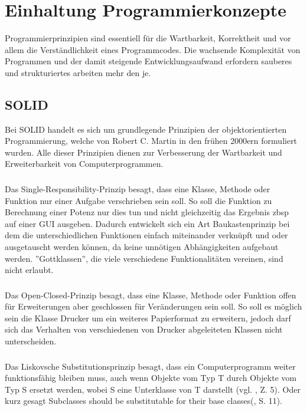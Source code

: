 
\section{Einhaltung Programmierkonzepte}

Programmierprinzipien sind essentiell für die Wartbarkeit, Korrektheit und vor allem die Verständlichkeit eines Programmcodes. Die wachsende Komplexität von Programmen und der damit steigende Entwicklungsaufwand erfordern sauberes und strukturiertes arbeiten mehr den je. 


\subsection{SOLID}
Bei SOLID handelt es sich um grundlegende Prinzipien der objektorientierten Programmierung, welche von Robert C. Martin in den frühen 2000ern formuliert wurden.  Alle dieser Prinzipien dienen zur Verbesserung der Wartbarkeit und Erweiterbarkeit von Computerprogrammen. 



\subsubsection{\textPrincipleSingleResponsibility}
\label{\textPrincipleSingleResponsibility}
Das Single-Responsibility-Prinzip besagt, dass eine Klasse, Methode oder Funktion
nur einer Aufgabe verschrieben sein soll. So soll die Funktion zu Berechnung einer
Potenz nur dies tun und nicht gleichzeitig das Ergebnis zbsp auf einer GUI ausgeben.
Dadurch entwickelt sich ein Art Baukastenprinzip bei dem die unterschiedlichen 
Funktionen einfach miteinander verknüpft und oder ausgetauscht werden können, da
keine unnötigen Abhängigkeiten aufgebaut werden. ''Gottklassen'', die viele
verschiedene Funktionalitäten vereinen, sind nicht erlaubt.

\subsubsection{\textPrincipleOpenClosed}
\label{\textPrincipleOpenClosed}
Das Open-Closed-Prinzip besagt, dass eine Klasse, Methode oder Funktion offen
für Erweiterungen aber geschlossen für Veränderungen sein soll. So soll es möglich
sein die Klasse Drucker um ein weiteres Papierformat zu erweitern, jedoch darf sich
das Verhalten von verschiedenen von Drucker abgeleiteten Klassen nicht unterscheiden.

\subsubsection{\textPrincipleLiskovSubstitution}
\label{\textPrincipleLiskovSubstitution}
Das Liskovsche Substitutionsprinzip besagt, dass ein Computerprogramm weiter funktionsfähig bleiben muss, auch wenn Objekte vom Typ T durch Objekte vom Typ S ersetzt werden, wobei S eine Unterklasse von T darstellt (vgl. \cite{wiki:lsp}, Z. 5). Oder kurz gesagt \glqq Subclasses should be substitutable for their base classes\grqq(\cite{knoernschild2002java}, S. 11).

